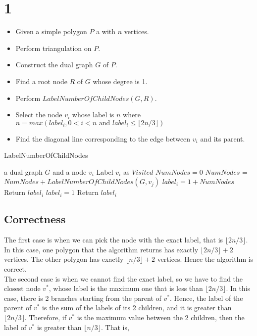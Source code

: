 
\section*{1}
\begin{itemize}
    \item Given a simple polygon $P$ a with $n$ vertices.
    \item Perform triangulation on $P$.
    \item Construct the dual graph $G$ of $P$.
    \item Find a root node $R$ of $G$ whose degree is 1.
    \item Perform $LabelNumberOfChildNodes(G,R)$.
    \item Select the node $v_i$ whose label is $n$ where $n = max(label_i,0<i<n \text{ and } label_i \leq \lfloor 2n/3\rfloor )$
    \item Find the diagonal line corresponding to the edge between $v_i$ and its parent.
\end{itemize}

\begin{algorithm}[h]
  \caption{LabelNumberOfChildNodes}
  \label{alg:LabelNumberOfChildNodes}
  \begin{algorithmic}
      \Require a dual graph $G$ and a node $v_i$
      \State Label $v_i$ as $Visited$
      \State $NumNodes = 0$
      \State $NumNodes$ = $NumNodes + LabelNumberOfChildNodes(G, v_j)$
      \EndIf
      \EndFor
      \State $label_i = 1 + NumNodes$
      \State Return $label_i$
      \Else
      \State $label_i = 1$
      \State Return $label_i$
      \EndIf
\end{algorithmic}
\end{algorithm}

\subsection*{Correctness}
The first case is when we can pick the node with the exact label, that is $\lfloor2n/3\rfloor$.
In this case, one polygon that the algorithm returns has exactly $\lfloor2n/3\rfloor + 2$ vertices. 
The other polygon has exactly $\lfloor n/3\rfloor + 2$ vertices.
Hence the algorithm is correct. \\

The second case is when we cannot find the exact label, so we have to find the closest node $v^*$, whose 
label is the maximum one that is less than $\lfloor2n/3\rfloor$. In this case, there is 2 branches starting
from the parent of $v^*$. Hence, the label of the parent of $v^*$ is the sum of the labels of its 2 children, 
and it is greater than $\lfloor2n/3\rfloor$. Therefore, if $v^*$ is the maximum value between the 2 children, 
then the label of $v^*$ is greater than $\lfloor n/3 \rfloor$. That is,

